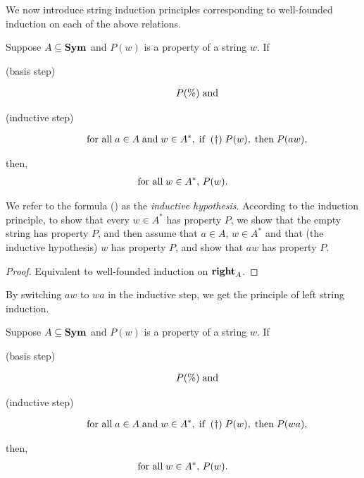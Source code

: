 We now introduce string induction principles corresponding to
well-founded induction on each of the above relations.

%
%
\begin{theorem}
Suppose $A\subseteq\mathbf{Sym}$ and $P(w)$ is a property of a string $w$.
If
\begin{description}
\item[\quad(basis step)]
\begin{gather*}
P(\%) \;\allowbreak\mbox{and}\allowbreak
\end{gather*}
\item[\quad(inductive step)]
\begin{gather*}
\allowbreak\mbox{for all}\allowbreak\;a\in A\;\allowbreak\mbox{and}\allowbreak\;w\in A^*,
\;\allowbreak\mbox{if}\allowbreak\;\;\allowbreak\mbox{\rm(\dag)}\allowbreak\; P(w),\;\allowbreak\mbox{then}\allowbreak\;P(aw),
\end{gather*}
\end{description}
then,
\begin{gather*}
\allowbreak\mbox{for all}\allowbreak\;w\in A^*,\,P(w) .
\end{gather*}
\end{theorem}

We refer to the formula (\dag) as the \emph{inductive hypothesis}.
According to the induction principle, to show that every $w\in A^*$
has property $P$, we show that the empty string has property $P$, and
then assume that $a\in A$, $w\in A^*$ and that (the inductive
hypothesis) $w$ has property $P$, and show that $aw$ has property
$P$.

\begin{proof}
Equivalent to well-founded induction on $\mathrel{\mathbf{right}}_A$.
\end{proof}

By switching $aw$ to $wa$ in the inductive step, we get the principle
of left string induction.

%
%
\begin{theorem}
Suppose $A\subseteq\mathbf{Sym}$ and $P(w)$ is a property of a string $w$.
If
\begin{description}
\item[\quad(basis step)]
\begin{gather*}
P(\%) \;\allowbreak\mbox{and}\allowbreak
\end{gather*}
\item[\quad(inductive step)]
\begin{gather*}
\allowbreak\mbox{for all}\allowbreak\;a\in A\;\allowbreak\mbox{and}\allowbreak\;w\in A^*,
\;\allowbreak\mbox{if}\allowbreak\; \;\allowbreak\mbox{\rm(\dag)}\allowbreak\; P(w),\;\allowbreak\mbox{then}\allowbreak\;P(wa),
\end{gather*}
\end{description}
then,
\begin{gather*}
\allowbreak\mbox{for all}\allowbreak\;w\in A^*,\,P(w) .
\end{gather*}
\end{theorem}


